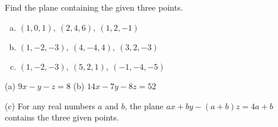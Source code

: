 \subsection*{\Procedural}

\begin{question}
Find the plane containing the given three points.
\begin{enumerate}[(a)]
\item
$(1,0,1),\ (2,4,6),\ (1,2,-1)$
\item
$(1,-2,-3),\ (4,-4,4),\ (3,2,-3)$
\item
$(1,-2,-3),\ (5,2,1),\ (-1,-4,-5)$ 
\end{enumerate}
\end{question}

%

\begin{answer}
(a) $9x-y-z=8$ \qquad
(b) $14x-7y-8z=52$ 

(c) For any real numbers $a$ and $b$, the plane  
$ax+by-(a+b)z=4a+b$ contains the three given points. 

\end{answer}

